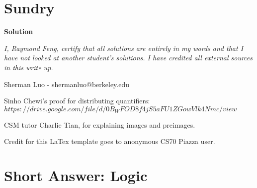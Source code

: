 \documentclass[11pt]{article}
\newcommand*{\Question}[1]{\vfill\pagebreak[3]\section{#1}}
\begin{document}
\section{Sundry} 
\begin{mdframed} \textbf{Solution} 
\item \textit {I, Raymond Feng, certify that all solutions are entirely in my words and that I have not looked at another student's solutions. I have credited all external sources in this write up.}
\item Sherman Luo - shermanluo@berkeley.edu
\item Sinho Chewi's proof for distributing quantifiers: \\
$https://drive.google.com/file/d/0B_WFOD8f4jS5aFU1ZGowVlk4Nmc/view$ 
\item CSM tutor Charlie Tian, for explaining images and preimages.
\item Credit for this LaTex template goes to anonymous CS70 Piazza user.
\end{mdframed}
\clearpage


\Question{Short Answer: Logic}
\end{document}
